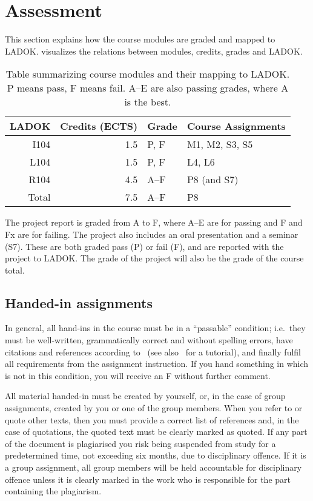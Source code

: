 \section{Assessment}
\label{Assessment}

This section explains how the course modules are graded and mapped to LADOK\@.
 visualizes the relations between modules, credits, grades and 
LADOK\@.

\begin{table}
  \centering
  \caption{%
    Table summarizing course modules and their mapping to LADOK\@.
    P means pass, F means fail.
    A--E are also passing grades, where A is the best.
  }\label{LADOKTable}
  \begin{tabular}{rrll}
    \toprule
    LADOK & Credits (ECTS)  & Grade       & Course Assignments\\
    \midrule
    I104  & 1.5             & P, F        & M1, M2, S3, S5\\
    L104  & 1.5             & P, F        & L4, L6\\
    R104  & 4.5             & A--F        & P8 (and S7)\\
    \midrule
    Total & 7.5             & A--F        & P8\\
    \bottomrule
  \end{tabular}
\end{table}

The project report is graded from A to F, where A--E are for passing and F and 
Fx are for failing.
The project also includes an oral presentation and a seminar (S7).
These are both graded pass (P) or fail (F), and are reported with the project 
to LADOK\@.
The grade of the project will also be the grade of the course total.

\subsection{Handed-in assignments}

In general, all hand-ins in the course must be in a \enquote{passable} 
condition; i.e.~they must be well-written, grammatically correct and without 
spelling errors, have citations and references according to~\cite{IEEEcitation} 
(see also~\cite{PurdueCitation} for a tutorial), and finally fulfil all 
requirements from the assignment instruction.
If you hand something in which is not in this condition, you will receive an 
F without further comment.

All material handed-in must be created by yourself, or, in the case of group 
assignments, created by you or one of the group members.
When you refer to or quote other texts, then you must provide a correct list of 
references and, in the case of quotations, the quoted text must be clearly 
marked as quoted.
If any part of the document is plagiarised you risk being suspended from study 
for a predetermined time, not exceeding six months, due to disciplinary 
offence.
If it is a group assignment, all group members will be held accountable for 
disciplinary offence unless it is clearly marked in the work who is responsible 
for the part containing the plagiarism.

